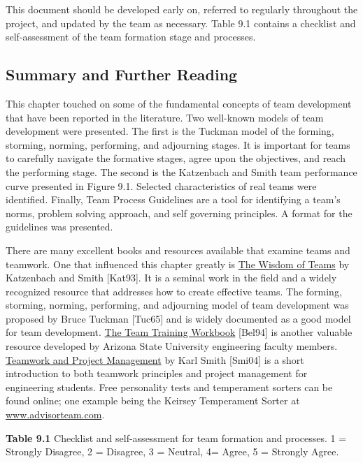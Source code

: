 This document should be developed early on, referred to regularly
throughout the project, and updated by the team as necessary. Table 9.1
contains a checklist and self-assessment of the team formation stage and
processes.

\subsection{Summary and Further
Reading}\label{summary-and-further-reading}

This chapter touched on some of the fundamental concepts of team
development that have been reported in the literature. Two well-known
models of team development were presented. The first is the Tuckman
model of the forming, storming, norming, performing, and adjourning
stages. It is important for teams to carefully navigate the formative
stages, agree upon the objectives, and reach the performing stage. The
second is the Katzenbach and Smith team performance curve presented in
Figure 9.1. Selected characteristics of real teams were identified.
Finally, Team Process Guidelines are a tool for identifying a team's
norms, problem solving approach, and self governing principles. A format
for the guidelines was presented.

There are many excellent books and resources available that examine
teams and teamwork. One that influenced this chapter greatly is \ul{The
Wisdom of Teams} by Katzenbach and Smith {[}Kat93{]}. It is a seminal
work in the field and a widely recognized resource that addresses how to
create effective teams. The forming, storming, norming, performing, and
adjourning model of team development was proposed by Bruce Tuckman
{[}Tuc65{]} and is widely documented as a good model for team
development. \ul{The Team Training Workbook} {[}Bel94{]} is another
valuable resource developed by Arizona State University engineering
faculty members. \ul{Teamwork and Project Management} by Karl Smith
{[}Smi04{]} is a short introduction to both teamwork principles and
project management for engineering students. Free personality tests and
temperament sorters can be found online; one example being the Keirsey
Temperament Sorter at
\href{http://www.advisorteam.com/}{www.advisorteam.com}.

\textbf{\hfill\break
Table 9.1} Checklist and self-assessment for team formation and
processes. 1 = Strongly Disagree, 2 = Disagree, 3 = Neutral, 4= Agree, 5
= Strongly Agree.

